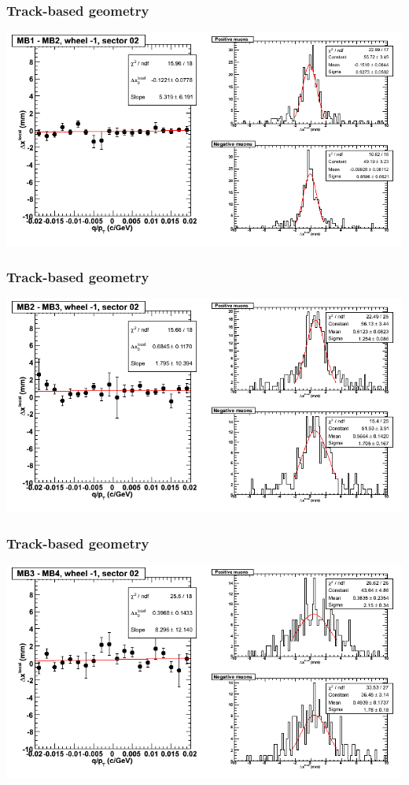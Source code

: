\documentclass[compress]{beamer}
\begin{document}
\begin{frame}
\frametitle{Track-based geometry}
\includegraphics[width=\linewidth]{NOV4_segdiffs/dt13_resid_B_02_12.png}
\end{frame}

\begin{frame}
\frametitle{Track-based geometry}
\includegraphics[width=\linewidth]{NOV4_segdiffs/dt13_resid_B_02_23.png}
\end{frame}

\begin{frame}
\frametitle{Track-based geometry}
\includegraphics[width=\linewidth]{NOV4_segdiffs/dt13_resid_B_02_34.png}
\end{frame}
\end{document}
